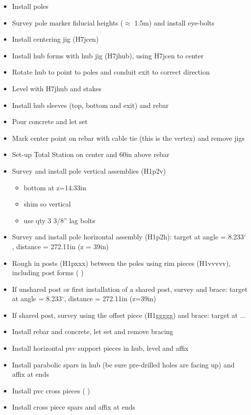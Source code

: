\documentclass[11pt]{article}
\begin{document}
\renewcommand{\labelitemi}{$\boxempty$}
\renewcommand{\labelitemii}{$\boxempty$}
\begin{itemize}
\item Install poles
\item Survey pole marker fiducial heights ($\approx$ 1.5m) and install eye-bolts
\item Install centering jig (H7jcen)
\item Install hub forms with hub jig (H7jhub), using H7jcen to center
\item Rotate hub to point to poles and conduit exit to correct direction
\item Level with H7jhub and stakes
\item Install hub sleeves (top, bottom and exit) and rebar
\item Pour concrete and let set
\item Mark center point on rebar with cable tie (this is the vertex) and remove jigs
\item Set-up Total Station on center and 60in above rebar
\item Survey and install pole vertical assemblies (H1p2v)
	\begin{itemize}
	\item bottom at z=14.33in
	\item shim so vertical
	\item use qty 3 3/8'' lag bolts
	\end{itemize}
\item Survey and install pole horizontal assembly (H1p2h):  target at angle = 8.233$^\circ$, distance = 272.11in (z = 39in)
\item Rough in posts (H1pxxx) between the poles using rim pieces (H1vvvvv), including post forms (   )
\item If unshared post or first installation of a shared post, survey and brace:  target at angle = 8.233$^\circ$, distance = 272.11in (z=39in)
\item If shared post, survey using the offset piece (H1ggggg) and brace:  target at ...
\item Install rebar and concrete,  let set and remove bracing
\item Install horizontal pvc support pieces in hub, level and affix
\item Install parabolic spars in hub (be sure pre-drilled holes are facing up) and affix at ends
\item Install pvc cross pieces ( )
\item Install cross piece spars and affix at ends

\end{itemize}
\end{document}

